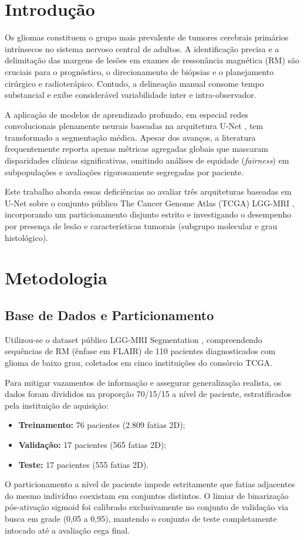 \documentclass[conference]{IEEEtran}
\begin{document}
\section{Introdução}
Os gliomas constituem o grupo mais prevalente de tumores cerebrais primários intrínsecos no sistema nervoso central de adultos. A identificação precisa e a delimitação das margens de lesões em exames de ressonância magnética (RM) são cruciais para o prognóstico, o direcionamento de biópsias e o planejamento cirúrgico e radioterápico. Contudo, a delineação manual consome tempo substancial e exibe considerável variabilidade inter e intra-observador.

A aplicação de modelos de aprendizado profundo, em especial redes convolucionais plenamente neurais baseadas na arquitetura U-Net \cite{ronneberger2015u}, tem transformado a segmentação médica. Apesar dos avanços, a literatura frequentemente reporta apenas métricas agregadas globais que mascaram disparidades clínicas significativas, omitindo análises de equidade (\textit{fairness}) em subpopulações e avaliações rigorosamente segregadas por paciente.

Este trabalho aborda essas deficiências ao avaliar três arquiteturas baseadas em U-Net sobre o conjunto público The Cancer Genome Atlas (TCGA) LGG-MRI \cite{buda2019association, mazurowski2017radiogenomics}, incorporando um particionamento disjunto estrito e investigando o desempenho por presença de lesão e características tumorais (subgrupo molecular e grau histológico).

\section{Metodologia}

\subsection{Base de Dados e Particionamento}
Utilizou-se o dataset público LGG-MRI Segmentation \cite{buda2019association}, compreendendo sequências de RM (ênfase em FLAIR) de 110 pacientes diagnosticados com glioma de baixo grau, coletados em cinco instituições do consórcio TCGA.

Para mitigar vazamentos de informação e assegurar generalização realista, os dados foram divididos na proporção 70/15/15 a nível de paciente, estratificados pela instituição de aquisição:
\begin{itemize}
    \item \textbf{Treinamento:} 76 pacientes (2.809 fatias 2D);
    \item \textbf{Validação:} 17 pacientes (565 fatias 2D);
    \item \textbf{Teste:} 17 pacientes (555 fatias 2D).
\end{itemize}
O particionamento a nível de paciente impede estritamente que fatias adjacentes do mesmo indivíduo coexistam em conjuntos distintos. O limiar de binarização pós-ativação sigmoid foi calibrado exclusivamente no conjunto de validação via busca em grade (0,05 a 0,95), mantendo o conjunto de teste completamente intocado até a avaliação cega final.
\end{document}
